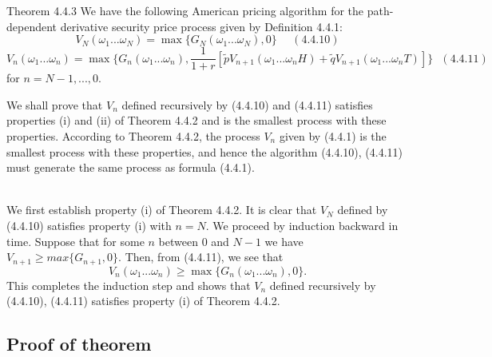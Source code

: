 \documentclass[c, dvipsnames, 8pt]{beamer}
\begin{document}
\begin{frame}[shrink=5]

\frametitle{\insertsection} 
\framesubtitle{\insertsubsection} 

\begin{block}{Theorem 4.4.3}
We have the following American pricing algorithm for the path-dependent derivative security price process given by Definition 4.4.1:
$$V_N(\omega_1...\omega_N)=\max\{G_N(\omega_1...\omega_N),0\} \ \ \ \ \ \ (4.4.10)$$
$$V_n(\omega_1...\omega_n)=\max\{G_n(\omega_1...\omega_n), \frac{1}{1+r}\left[\tilde{p}V_{n+1}(\omega_1...\omega_nH)+\tilde{q}V_{n+1}(\omega_1...\omega_nT)\right]\} \ \ \ (4.4.11)$$
for $n=N-1,...,0$.
\end{block}

We shall prove that $V_n$ defined recursively by (4.4.10) and (4.4.11) satisfies properties (i) and (ii) of Theorem 4.4.2 and is the smallest process with these properties. According to Theorem 4.4.2, the process $V_n$ given by (4.4.1) is the smallest process with these properties, and hence the algorithm (4.4.10), (4.4.11) must generate the same process as formula (4.4.1).\\

\

We first establish property (i) of Theorem 4.4.2. It is clear that $V_N$ defined by (4.4.10) satisfies property (i) with $n = N$. We proceed by induction 
backward in time. Suppose that for some $n$ between $0$ and $N-1$ we have $V_{n+1}\ge max\{G_{n+1},0\}$. Then, from (4.4.11), we see that
\begin{equation}\label{key}
V_n(\omega_1...\omega_n)\ge \max\{G_n(\omega_1...\omega_n),0\}.
\end{equation}
This completes the induction step and shows that $V_n$ defined recursively by (4.4.10), (4.4.11) satisfies property (i) of Theorem 4.4.2.
 
\end{frame}

\subsection{Proof of theorem}
\end{document}
